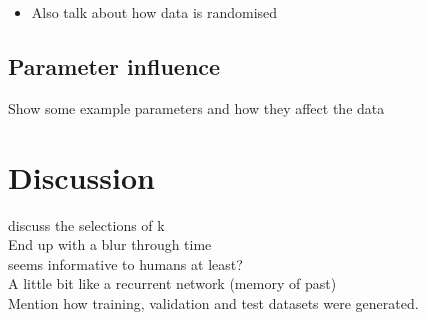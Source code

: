 \begin{itemize}
    \item Also talk about how data is randomised
\end{itemize}
 


\subsection{Parameter influence}
Show some example parameters and how they affect the data \\


\section{Discussion}

 discuss the selections of k \\
 End up with a blur through time \\
 seems informative to humans at least? \\
 A little bit like a recurrent network (memory of past) \\
 Mention how training, validation and test datasets were generated.\\



